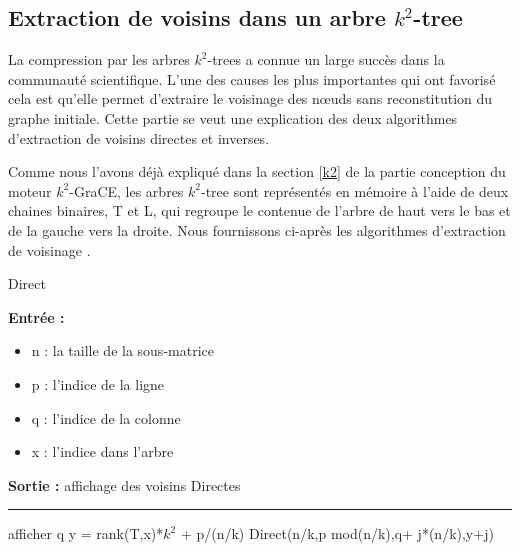 \documentclass[a4paper,oneside,12pt]{report}
\theoremstyle{definition}
\begin{document}
\pagestyle{plain}
\newpage

\begin{appendix}


\chapter{Extraction de voisins dans un arbre $k^2$-tree}
    \label{k2_annexe}
La compression par les arbres $k^2$-trees a connue un large succès dans la communauté scientifique. L'une des causes les plus importantes qui ont favorisé cela est qu'elle permet d'extraire le voisinage des nœuds sans reconstitution du graphe initiale. Cette partie se veut une explication des deux algorithmes d'extraction de voisins directes et inverses. 

Comme nous l'avons déjà expliqué dans la section \ref{k2} de la partie conception   du moteur $k^2$-GraCE, les arbres $k^2$-tree sont représentés en mémoire à l'aide de deux chaines binaires, T et L, qui regroupe le contenue de l'arbre de haut vers le bas et de la gauche vers la droite. Nous fournissons ci-après les algorithmes d'extraction de voisinage \citep{brisaboa2009k}.



\begin{multicols}{2}

\begin{algorithm}[H]
					\label{alg:Direct}
					\caption{Direct}
					\textbf{Entrée :}
						\begin{itemize}[label=$\bullet$]
							\item n : la taille de la sous-matrice
							\item p : l'indice de la ligne 
							\item q : l'indice de la colonne
							\item x : l'indice dans l'arbre
						\end{itemize}
					\textbf{Sortie :} affichage des voisins Directes\\							\noindent\rule{\textwidth}{1pt}
						
						
				\begin{algorithmic} [1]
							\STATE afficher q
						\ENDIF
					\ELSE
							\STATE y = rank(T,x)*$k^2$ + p/(n/k)
								\STATE Direct(n/k,p mod(n/k),q+ j*(n/k),y+j)
							\ENDFOR
						\ENDIF
					\ENDIF 
					
					
				\end{algorithmic}
			\end{algorithm}



\end{multicols}
\end{appendix}
\end{document}
